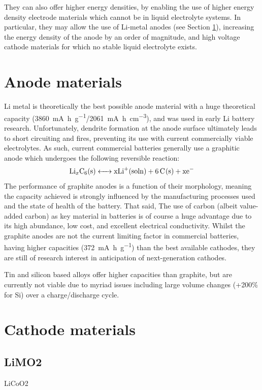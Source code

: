 They can also offer higher energy densities, by enabling the use of higher energy density electrode materials which cannot be in liquid electrolyte systems.
In particular, they may allow the use of Li-metal anodes (see Section \ref{sec:anodes}), increasing the energy density of the anode by an order of magnitude,\cite{Zhang2018} and high voltage cathode materials for which no stable liquid electrolyte exists.
\newpage
\section{Anode materials}
\label{sec:anodes}
Li metal is theoretically the best possible anode material with a huge theoretical capacity (\SI{3860}{\milli\ampere\hour\per\gram}/\SI{2061}{\milli\ampere\hour\per\centi\meter\cubed}), and was used in early Li battery research. 
Unfortunately, dendrite formation at the anode surface ultimately leads to short circuiting and fires, preventing its use with current commercially viable electrolytes. \cite{Cheng2017,Guo2017a,Lin2017}
As such, current commercial batteries generally use a graphitic anode which undergoes the following reversible reaction:
\begin{equation}
\ce{Li_xC6(s) <-> xLi+(soln) +6C(s) + xe-}
\end{equation}
The performance of graphite anodes is a function of their morphology, meaning the capacity achieved is strongly influenced by the manufacturing processes used and the state of health of the battery.
That said, 
The use of carbon (albeit value-added carbon) as key material in batteries is of course a huge advantage due to its high abundance, low cost, and excellent electrical conductivity.
Whilst the graphite anodes are not the current limiting factor in commercial batteries, having higher capacities (\SI{372}{\milli\ampere\hour\per\gram}) than the best available cathodes, they are still of research interest in anticipation of next-generation cathodes.

Tin and silicon based alloys offer higher capacities than graphite, but are currently not viable due to myriad issues including large volume changes (+200\% for Si) over a charge/discharge cycle.\cite{Scrosati2011}

\newpage
\section{Cathode materials}
\subsection{LiMO2}
LiCoO2

